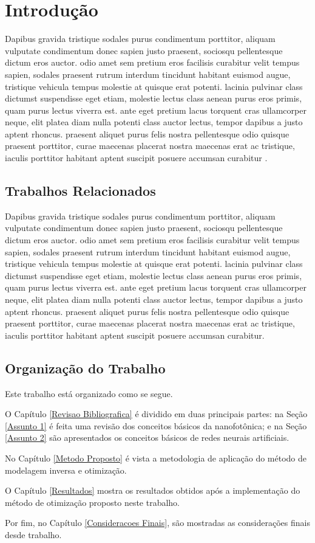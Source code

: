 \chapter{Introdução}      \label{Introducao}

Dapibus gravida tristique sodales purus condimentum porttitor, aliquam vulputate condimentum donec sapien justo praesent, sociosqu pellentesque dictum eros auctor. odio amet sem pretium eros facilisis curabitur velit tempus sapien, sodales praesent rutrum interdum tincidunt habitant euismod augue, tristique vehicula tempus molestie at quisque erat potenti. lacinia pulvinar class dictumst suspendisse eget etiam, molestie lectus class aenean purus eros primis, quam purus lectus viverra est. ante eget pretium lacus torquent cras ullamcorper neque, elit platea diam nulla potenti class auctor lectus, tempor dapibus a justo aptent rhoncus. praesent aliquet purus felis nostra pellentesque odio quisque praesent porttitor, curae maecenas placerat nostra maecenas erat ac tristique, iaculis porttitor habitant aptent suscipit posuere accumsan curabitur \cite{alexander2013fundamentos}.


\section{Trabalhos Relacionados}

Dapibus gravida tristique sodales purus condimentum porttitor, aliquam vulputate condimentum donec sapien justo praesent, sociosqu pellentesque dictum eros auctor. odio amet sem pretium eros facilisis curabitur velit tempus sapien, sodales praesent rutrum interdum tincidunt habitant euismod augue, tristique vehicula tempus molestie at quisque erat potenti. lacinia pulvinar class dictumst suspendisse eget etiam, molestie lectus class aenean purus eros primis, quam purus lectus viverra est. ante eget pretium lacus torquent cras ullamcorper neque, elit platea diam nulla potenti class auctor lectus, tempor dapibus a justo aptent rhoncus. praesent aliquet purus felis nostra pellentesque odio quisque praesent porttitor, curae maecenas placerat nostra maecenas erat ac tristique, iaculis porttitor habitant aptent suscipit posuere accumsan curabitur.


\section{Organização do Trabalho}

Este trabalho está organizado como se segue.

O Capítulo \ref{Revisao Bibliografica} é dividido em duas principais partes: na Seção \ref{Assunto 1} é feita uma revisão dos conceitos básicos da nanofotônica; e na Seção \ref{Assunto 2} são apresentados os conceitos básicos de redes neurais artificiais.

No Capítulo \ref{Metodo Proposto} é vista a metodologia de aplicação do método de modelagem inversa e otimização.

O Capítulo \ref{Resultados} mostra os resultados obtidos após a implementação do método de otimização proposto neste trabalho.

Por fim, no Capítulo \ref{Consideracoes Finais}, são mostradas as considerações finais desde trabalho.